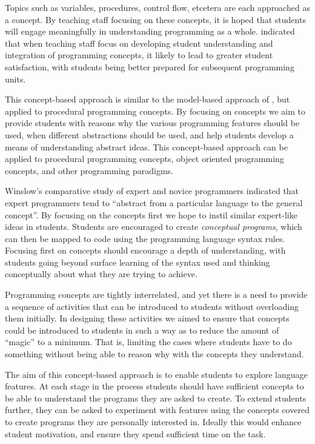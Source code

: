 Topics such as variables, procedures, control flow, etcetera are each approached as a concept. By teaching staff focusing on these concepts, it is hoped that students will engage meaningfully in understanding programming as a whole. \citet{Bruce:2003} indicated that when teaching staff focus on developing student understanding and integration of programming concepts, it likely to lead to greater student satisfaction, with students being better prepared for subsequent programming units.

This concept-based approach is similar to the model-based approach of \citet{Bennedsen:2004}, but applied to procedural programming concepts. By focusing on concepts we aim to provide students with reasons why the various programming features should be used, when different abstractions should be used, and help students develop a means of understanding abstract ideas. This concept-based approach can be applied to procedural programming concepts, object oriented programming concepts, and other programming paradigms. 

Winslow's comparative study of expert and novice programmers \cite{Winslow:1996} indicated that expert programmers tend to ``abstract from a particular language to the general concept''. By focusing on the concepts first we hope to instil similar expert-like ideas in students. Students are encouraged to create \emph{conceptual programs}, which can then be mapped to code using the programming language syntax rules. Focusing first on concepts should encourage a depth of understanding, with students going beyond surface learning of the syntax used and thinking conceptually about what they are trying to achieve.

Programming concepts are tightly interrelated, and yet there is a need to provide a sequence of activities that can be introduced to students without overloading them initially. In designing these activities we aimed to ensure that concepts could be introduced to students in such a way as to reduce the amount of ``magic'' to a minimum. That is, limiting the cases where students have to do something without being able to reason why with the concepts they understand.

The aim of this concept-based approach is to enable students to explore language features. At each stage in the process students should have sufficient concepts to be able to understand the programs they are asked to create. To extend students further, they can be asked to experiment with features using the concepts covered to create programs they are personally interested in. Ideally this would enhance student motivation, and ensure they spend sufficient time on the task. 


